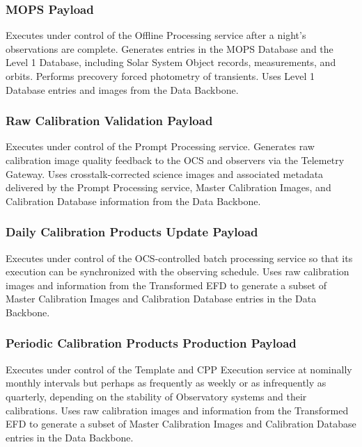 \documentclass[DM,lsstdraft,toc]{lsstdoc}
\begin{document}
\subsubsection{MOPS Payload}\label{mops-payload}

Executes under control of the Offline Processing service after a night's
observations are complete. Generates entries in the MOPS Database and
the Level 1 Database, including Solar System Object records,
measurements, and orbits. Performs precovery forced photometry of
transients. Uses Level 1 Database entries and images from the Data
Backbone.

\subsubsection{Raw Calibration Validation
Payload}\label{raw-calibration-validation-payload}

Executes under control of the Prompt Processing service. Generates raw
calibration image quality feedback to the OCS and observers via the
Telemetry Gateway. Uses crosstalk-corrected science images and
associated metadata delivered by the Prompt Processing service, Master
Calibration Images, and Calibration Database information from the Data
Backbone.

\subsubsection{Daily Calibration Products Update
Payload}\label{daily-calibration-products-update-payload}

Executes under control of the OCS-controlled batch processing service so
that its execution can be synchronized with the observing schedule. Uses
raw calibration images and information from the Transformed EFD to
generate a subset of Master Calibration Images and Calibration Database
entries in the Data Backbone.

\subsubsection{Periodic Calibration Products Production
Payload}\label{periodic-calibration-products-production-payload}

Executes under control of the Template and CPP Execution service at
nominally monthly intervals but perhaps as frequently as weekly or as
infrequently as quarterly, depending on the stability of Observatory
systems and their calibrations. Uses raw calibration images and
information from the Transformed EFD to generate a subset of Master
Calibration Images and Calibration Database entries in the Data
Backbone.
\end{document}
